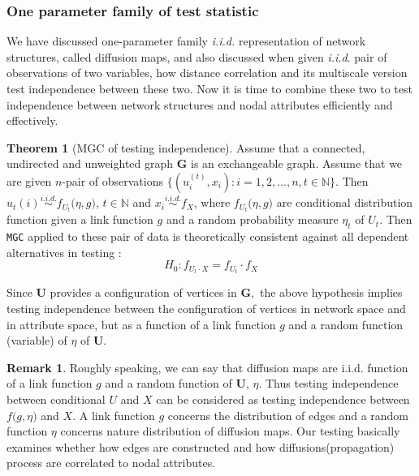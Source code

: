 \documentclass[12pt]{article}
\theoremstyle{definition}
\newtheorem{theorem}{Theorem}[section]
\newtheorem{remark}{Remark}
\begin{document}
\subsubsection{One parameter family of test statistic}

We have discussed one-parameter family \textit{i.i.d.} representation of network structures, called diffusion maps, and also discussed when given \textit{i.i.d}. pair of observations of two variables, how distance correlation and its multiscale version test independence between these two. Now it is time to combine these two to test independence between network structures and nodal attributes efficiently and effectively.
	
\begin{theorem}[MGC of testing independence]
 \label{theorem1}
	Assume that a connected, undirected and unweighted graph $\mathbf{G}$ is an exchangeable graph.  Assume that we are given $n$-pair of observations $\{ (u^{(t)}_{i}, x_{i}): i = 1,2,... , n  , t \in \mathbb{N} \}$. Then $u_{t}(i) \overset{i.i.d.}{\sim} f_{U_t} \big(  \eta, g \big)$, $t \in \mathbb{N}$ and $x_{i} \overset{i.i.d.}{\sim} f_{X}$, where $f_{U_t} \big( \eta, g \big)$ are conditional distribution function given a link function $g$ and a random probability measure $\eta_{t}$ of $U_t$. Then \texttt{MGC} applied to these pair of data is theoretically consistent against all dependent alternatives in testing :
		$$H_{0} : f_{U_t \cdot X} = f_{U_t} \cdot f_{X}$$
\end{theorem}
	
Since $\boldsymbol{U}$ provides a configuration of vertices in $\boldsymbol{G},$ the above hypothesis implies testing independence between the configuration of vertices in network space and in attribute space, but as a function of a link function $g$ and a random function (variable) of $\eta$ of $\mathbf{U}$.
	
\begin{remark}
	Roughly speaking, we can say that diffusion maps are i.i.d. function of a link function $g$ and a random function of $\mathbf{U}$, $\eta$. Thus testing independence between conditional $U$ and $X$ can be considered as testing independence between $f \big( g, \eta \big)$ and $X$. A link function $g$ concerns the distribution of edges and a random function $\eta$ concerns nature distribution of diffusion maps. Our testing basically examines whether how edges are constructed and how diffusions(propagation) process are correlated to nodal attributes.  
	\end{remark}
	
\end{document}
